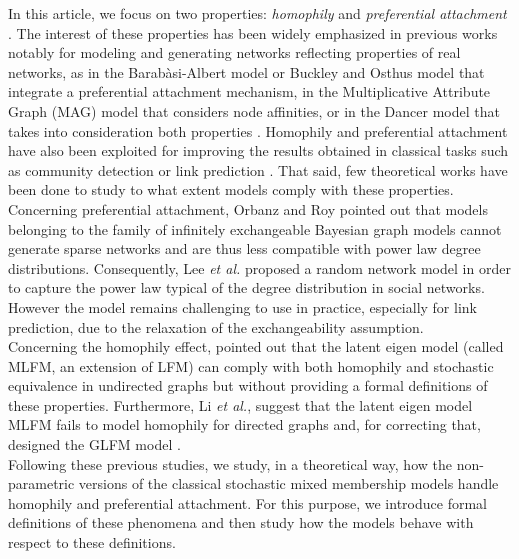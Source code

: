 \documentclass[journal]{IEEEtran}
\begin{document}
In this article, we focus on two properties:  \textit{homophily} and \textit{preferential attachment} \cite{Newman2010, Barabasi2003}. The interest of these properties has been widely emphasized in previous works notably for modeling and generating networks reflecting properties of real networks, as in the Barab\`asi-Albert model \cite{albert2002statistical} or Buckley and Osthus model \cite{Buckley2001} that integrate a preferential attachment mechanism, in the Multiplicative Attribute Graph (MAG) model \cite{Kim2012} that considers node affinities, or in the Dancer model that takes into consideration both properties \cite{Largeron2017}. Homophily and preferential attachment have also  been exploited for improving the results obtained in classical tasks such as community detection \cite{Ciglan2013,Zhang2016} or link prediction \cite{Aiello2012,Zeng2016}. That said, few theoretical works have been done to study to what extent models comply with these properties. ~\\

Concerning preferential attachment, Orbanz and Roy \cite{orbanz2015bayesian} pointed out that models belonging to the family of infinitely exchangeable Bayesian graph models cannot generate sparse networks and are thus less compatible with power law degree distributions. Consequently, Lee \textit{et al.} \cite{Lee2015} proposed a random network model in order to capture the power law typical of the degree distribution in social networks. However the model remains challenging to use in practice, especially for link prediction, due to the relaxation of the exchangeability assumption.~\\

Concerning the homophily effect, \cite{hoff2008modeling} pointed out that the latent eigen model (called MLFM, an extension of LFM) can comply with both homophily and stochastic equivalence in undirected graphs but without providing a formal definitions of these properties. Furthermore, Li \textit{et al.}, suggest that the latent eigen model  MLFM fails to model homophily  for directed graphs and, for correcting that, designed the GLFM model \cite{Li11}.~\\

Following these previous studies, we study, in a theoretical way, how the non-parametric versions of the classical stochastic mixed membership models handle homophily and preferential attachment. For this purpose, we introduce formal definitions of these phenomena and then study how the models behave with respect  to these definitions.
\end{document}
